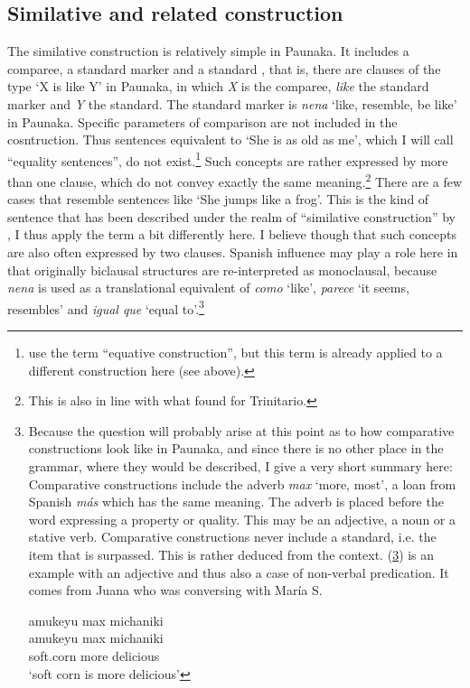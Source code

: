 
\subsection{Similative and related construction}\label{sec:SimilativePreds}

The similative construction is relatively simple in Paunaka. It includes a comparee, a standard marker and a standard \citep[cf.][]{HaspelmathBuchholz1998}, that is, there are clauses of the type ‘X is like Y’ in Paunaka, in which \textit{X} is the comparee, \textit{like} the standard marker and \textit{Y} the standard. The standard marker is \textit{nena} ‘like, resemble, be like’ in Paunaka. Specific parameters of comparison are not included in the cosntruction. Thus sentences equivalent to ‘She is as old as me’, which I will call “equality sentences”, do not exist.\footnote{\citet[277]{HaspelmathBuchholz1998} use the term “equative construction”, but this term is already applied to a different construction here (see  above).} Such concepts are rather expressed by more than one clause, which do not convey exactly the same meaning.\footnote{This is also in line with what \citet[]{Rose2019c} found for Trinitario.} There are a few cases that resemble sentences like ‘She jumps like a frog’. This is the kind of sentence that has been described under the realm of “similative construction” by \citet[277]{HaspelmathBuchholz1998}, I thus apply the term a bit differently here. I believe though that such concepts are also often expressed by two clauses. Spanish influence may play a role here in that originally biclausal structures are re-interpreted as monoclausal, because \textit{nena} is used as a translational equivalent of \textit{como} ‘like’, \textit{parece} ‘it seems, resembles’ and \textit{igual que} ‘equal to’.\footnote{Because the question will probably arise at this point as to how comparative constructions look like in Paunaka, and since there is no other place in the grammar, where they would be described, I give a very short summary here: Comparative constructions include the adverb \textit{max} ‘more, most’, a loan from Spanish \textit{más} which has the same meaning. The adverb is placed before the word expressing a property or quality. This may be an adjective, a noun or a stative verb. Comparative constructions never include a standard, i.e. the item that is surpassed. This is rather deduced from the context. (\ref{ex:comp-adj}) is an example with an adjective and thus also a case of non-verbal predication. It comes from Juana who was conversing with María S.

\ea\label{ex:comp-adj}
\begingl
\glpreamble amukeyu max michaniki\\
\gla amukeyu max michaniki\\
\glb soft.corn more delicious\\
\glft ‘soft corn is more delicious’
\endgl
{}
\xe}

